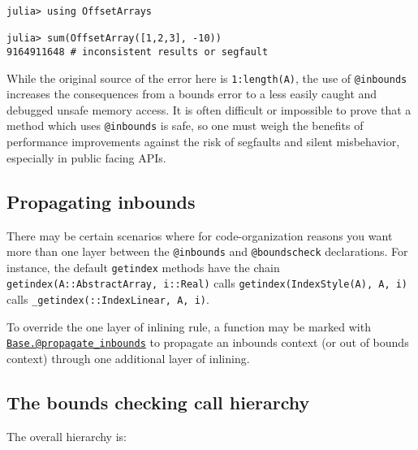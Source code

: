\begin{verbatim}
julia> using OffsetArrays

julia> sum(OffsetArray([1,2,3], -10))
9164911648 # inconsistent results or segfault
\end{verbatim}



While the original source of the error here is \texttt{1:length(A)}, the use of \texttt{@inbounds} increases the consequences from a bounds error to a less easily caught and debugged unsafe memory access. It is often difficult or impossible to prove that a method which uses \texttt{@inbounds} is safe, so one must weigh the benefits of performance improvements against the risk of segfaults and silent misbehavior, especially in public facing APIs.



\hypertarget{10208484018202603417}{}


\subsection{Propagating inbounds}



There may be certain scenarios where for code-organization reasons you want more than one layer between the \texttt{@inbounds} and \texttt{@boundscheck} declarations. For instance, the default \texttt{getindex} methods have the chain \texttt{getindex(A::AbstractArray, i::Real)} calls \texttt{getindex(IndexStyle(A), A, i)} calls \texttt{\_getindex(::IndexLinear, A, i)}.



To override the {\textquotedbl}one layer of inlining{\textquotedbl} rule, a function may be marked with \hyperlink{4942611866585954207}{\texttt{Base.@propagate\_inbounds}} to propagate an inbounds context (or out of bounds context) through one additional layer of inlining.



\hypertarget{17261866997775737461}{}


\subsection{The bounds checking call hierarchy}



The overall hierarchy is:



